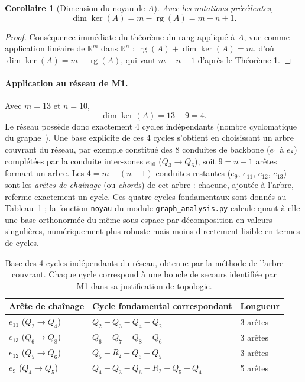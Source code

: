 \documentclass[11pt,a4paper]{article}
\theoremstyle{plain}
\newtheorem{corollaire}{Corollaire}
\theoremstyle{definition}
\theoremstyle{remark}
\begin{document}
\begin{corollaire}[Dimension du noyau de $A$]
Avec les notations précédentes,
\begin{equation}
\dim \ker(A) = m - \operatorname{rg}(A) = m - n + 1.
\label{eq:dim-ker-A}
\end{equation}
\end{corollaire}

\begin{proof}
Conséquence immédiate du théorème du rang appliqué à $A$, vue comme
application linéaire de $\mathbb{R}^m$ dans $\mathbb{R}^n$ :
$\operatorname{rg}(A) + \dim \ker(A) = m$, d'où
$\dim \ker(A) = m - \operatorname{rg}(A)$, qui vaut $m - n + 1$ d'après le
Théorème 1.
\end{proof}

\paragraph{Application au réseau de M1.} Avec $m = 13$ et $n = 10$,
\begin{equation}
\dim \ker(A) = 13 - 9 = 4.
\end{equation}
Le réseau possède donc exactement 4 cycles indépendants (nombre
cyclomatique du graphe~\cite{bapat2010}). Une base explicite de ces 4
cycles s'obtient en choisissant un arbre couvrant du réseau, par exemple
constitué des 8 conduites de backbone ($e_1$ à $e_8$) complétées par la
conduite inter-zones $e_{10}$ ($Q_3 \to Q_6$), soit $9 = n-1$ arêtes
formant un arbre. Les $4 = m - (n-1)$ conduites restantes ($e_9$, $e_{11}$,
$e_{12}$, $e_{13}$) sont les \emph{arêtes de chaînage} (ou \emph{chords}) de
cet arbre : chacune, ajoutée à l'arbre, referme exactement un cycle. Ces
quatre cycles fondamentaux sont donnés au Tableau~\ref{tab:cycles} ; la
fonction \texttt{noyau} du module \texttt{graph\_analysis.py} calcule quant
à elle une base orthonormée du même sous-espace par décomposition en
valeurs singulières, numériquement plus robuste mais moins directement
lisible en termes de cycles.

\begin{table}[h]
\centering
\begin{tabular}{@{}lll@{}}
\toprule
Arête de chaînage & Cycle fondamental correspondant & Longueur \\
\midrule
$e_{11}$ ($Q_2 \to Q_4$) & $Q_2 - Q_3 - Q_4 - Q_2$ & 3 arêtes \\
$e_{13}$ ($Q_6 \to Q_8$) & $Q_6 - Q_7 - Q_8 - Q_6$ & 3 arêtes \\
$e_{12}$ ($Q_5 \to Q_6$) & $Q_5 - R_2 - Q_6 - Q_5$ & 3 arêtes \\
$e_{9}$ ($Q_4 \to Q_5$) & $Q_4 - Q_3 - Q_6 - R_2 - Q_5 - Q_4$ & 5 arêtes \\
\bottomrule
\end{tabular}
\caption{Base des 4 cycles indépendants du réseau, obtenue par la méthode
de l'arbre couvrant. Chaque cycle correspond à une boucle de secours
identifiée par M1 dans sa justification de topologie.}
\label{tab:cycles}
\end{table}
\end{document}
